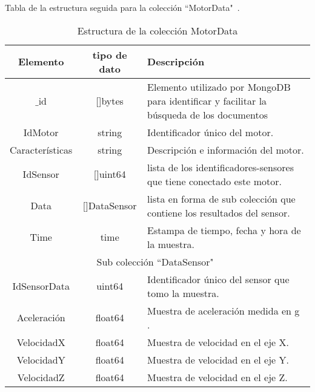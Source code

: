     \begin{table}[ht]
        \begin{center}
            Tabla de la estructura seguida para la colección ``MotorData"\ .\\

            \vspace{0.3cm}
            \begin{tabular}{|c|c|p{9cm}|}
                \hline
                Elemento        & tipo de dato & Descripción \\\hline\hline
                $\_$id      & []bytes  & Elemento utilizado por MongoDB para
                identificar y facilitar la búsqueda de los documentos\\\hline
                IdMotor         & string   & Identificador único del motor.\\\hline
                Características & string   & Descripción e información del motor.\\\hline
                IdSensor        & []uint64 & lista de los identificadores-sensores
                que tiene conectado este motor.\\\hline
                Data            & []DataSensor & lista en forma de sub colección
                que contiene los resultados del sensor.\\\hline
                Time            & time  & Estampa de tiempo, fecha y hora de la muestra.\\\hline
                \hline
                \multicolumn{3}{|c|}{Sub colección  ``DataSensor"\ }\\\hline\hline
                IdSensorData & uint64 & Identificador único del sensor que tomo la muestra.\\\hline
                Aceleración  & float64 & Muestra de aceleración medida en g .\\\hline
                VelocidadX & float64 & Muestra de velocidad en el eje X.\\\hline
                VelocidadY & float64 & Muestra de velocidad en el eje Y.\\\hline
                VelocidadZ & float64 & Muestra de velocidad en el eje Z.\\
                \hline
            \end{tabular}
        \end{center}
        \caption[Estructura de MotorData]{Estructura de la colección MotorData}
        \label{tab:MotorDatabson}
    \end{table}

